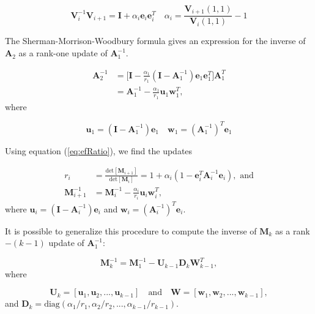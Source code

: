 \begin{equation}
\bm V_i^{-1} \bm V_{i+1} = \bm I + \alpha_i \bm e_i \bm e_i^T \quad \alpha_i = \frac{\bm V_{i+1}(1,1)}{\bm V_i (1,1)} -1
\end{equation}

The Sherman-Morrison-Woodbury formula gives an expression for the inverse of $\bm A_2$ as a rank-one update of $\bm A_1^{-1}$.

\begin{equation}
\begin{split}
\bm A_2^{-1} &= \bigg[ \bm I - \frac{\alpha_1}{r_1} ( \bm I - \bm A_1^{-1} ) \bm e_1 \bm e_1^T  \bigg] \bm A_1^T \\
&= \bm A_1^{-1} - \frac{\alpha_1}{r_1} \bm u_1 \bm w_1^T ,
\end{split}
\end{equation}
where

\begin{equation*}
\bm u_1 = (\bm I - \bm A_1^{-1} ) \bm e_1 \quad \bm w_1 = (\bm A_1^{-1})^T \bm e_1
\end{equation*}

Using equation (\ref{eq:efRatio}), we find the updates

\begin{equation}
\begin{split}
r_i &= \frac{\text{det}[\bm M_{i+1}]}{\text{det}[\bm M_{i}]} = 1 + \alpha_i ( 1 - \bm e_i^T \bm A_i^{-1}  \bm e_i ) , \,\, \text{and} \\
\bm M_{i+1}^{-1} &= \bm M_i^{-1} - \frac{\alpha_i}{r_i} \bm u_i \bm w_i^T ,
\end{split}
\end{equation}
where $\bm u_i = (\bm I - \bm A_i^{-1} ) \bm e_i$ and $\bm w_i = (\bm A_i^{-1})^T \bm e_i$.

It is possible to generalize this procedure to compute the inverse of $\bm M_k$ as a rank$-(k-1)$ update of $\bm A_1^{-1}$:

\begin{equation}
\bm M_k^{-1} = \bm M_1^{-1} - \bm U_{k-1} \bm D_k \bm W_{k-1}^T ,
\end{equation}
where

\begin{equation}
\bm U_k = [ \bm u_1 , \bm u_2, ..., \bm u_{k-1} ] \quad \text{and} \quad \bm W = [ \bm w_1, \bm w_2, ..., \bm w_{k-1} ] ,
\end{equation}
and $\bm D_k = \text{diag}(\alpha_1 / r_1, \alpha_2 / r_2, ..., \alpha_{k-1} / r_{k-1})$.

